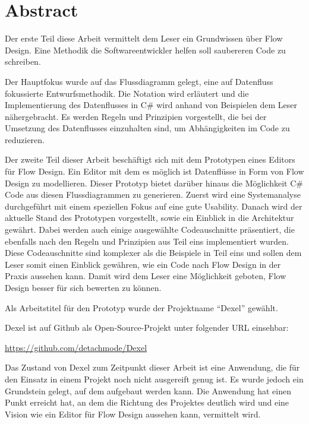 
\chapter*{Abstract}

Der erste Teil diese Arbeit vermittelt dem Leser ein Grundwissen über Flow Design. Eine Methodik die Softwareentwickler helfen soll saubereren Code zu schreiben.

Der Hauptfokus wurde auf das Flussdiagramm gelegt,
eine auf Datenfluss fokussierte Entwurfsmethodik.
Die Notation wird erläutert und die Implementierung des Datenflusses in C\# wird anhand von Beispielen dem Leser nähergebracht.
Es werden Regeln und Prinzipien vorgestellt, die bei der Umsetzung des Datenflusses einzuhalten sind, um Abhängigkeiten im Code zu reduzieren.

Der zweite Teil dieser Arbeit beschäftigt sich mit dem Prototypen eines
Editors für Flow Design. Ein Editor mit dem es möglich ist Datenflüsse in Form von Flow Design zu modellieren. Dieser Prototyp bietet darüber hinaus die Möglichkeit C\# Code aus diesen Flussdiagrammen zu generieren. 
Zuerst wird eine Systemanalyse durchgeführt mit einem
speziellen Fokus auf eine gute Usability.
Danach wird der aktuelle Stand des Prototypen vorgestellt, sowie ein Einblick in die Architektur gewährt. Dabei werden auch einige
ausgewählte Codeauschnitte präsentiert, die ebenfalls nach den Regeln und Prinzipien aus Teil eins implementiert wurden.
Diese Codeauschnitte sind komplexer als die Beispiele in Teil eins und sollen dem Leser somit einen Einblick gewähren, wie ein Code nach Flow Design in der Praxis aussehen kann.
Damit wird dem Leser eine Möglichkeit geboten, Flow Design besser für sich bewerten zu können.

Als Arbeitstitel für den Prototyp wurde der Projektname \enquote{Dexel} gewählt.

Dexel ist auf Github als Open-Source-Projekt unter folgender URL einsehbar:

\url{https://github.com/detachmode/Dexel}

Das Zustand von Dexel zum Zeitpunkt dieser Arbeit ist eine
Anwendung, die für den Einsatz in einem Projekt noch nicht ausgereift genug ist. 
Es wurde jedoch ein Grundstein gelegt, auf dem aufgebaut werden kann.
Die Anwendung hat einen Punkt erreicht hat, an dem die
Richtung des Projektes deutlich wird und eine Vision wie ein Editor für Flow Design aussehen kann, vermittelt wird.




